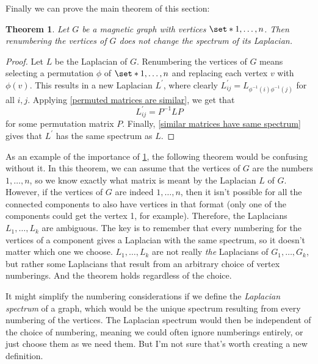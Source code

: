 \documentclass[12pt]{article}
\newtheorem{thm}{Theorem}
\theoremstyle{definition}
\begin{document}
Finally we can prove the main theorem of this section:

\begin{thm}\label{renumbering vertices doesn't change Laplacian spectrum}
Let $G$ be a magnetic graph with vertices $\set*{1, \dots, n}$. Then renumbering the vertices of $G$ does not change the spectrum of its Laplacian.
\end{thm}
\begin{proof}
Let $L$ be the Laplacian of $G$. Renumbering the vertices of $G$ means selecting a permutation $\phi$ of $\set*{1, \dots, n}$ and replacing each vertex $v$ with $\phi(v)$. This results in a new Laplacian $L^\prime$, where clearly $L^\prime_{ij} = L_{\phi^{-1}(i)\phi^{-1}(j)}$ for all $i, j$. Applying \cref{permuted matrices are similar}, we get that 
$$L^\prime_{ij}=P^{-1}LP$$
for some permutation matrix $P$. Finally, \cref{similar matrices have same spectrum} gives that $L^\prime$ has the same spectrum as $L$.  
\end{proof}

As an example of the importance of \cref{renumbering vertices doesn't change Laplacian spectrum}, the following theorem would be confusing without it. In this theorem, we can assume that the vertices of $G$ are the numbers $1, \dots, n$, so we know exactly what matrix is meant by the Laplacian $L$ of $G$. However, if the vertices of $G$ are indeed $1, \dots, n$, then it isn't possible for all the connected components to also have vertices in that format (only one of the components could get the vertex 1, for example). Therefore, the Laplacians $L_1, \dots, L_k$ are ambiguous. The key is to remember that every numbering for the vertices of a component gives a Laplacian with the same spectrum, so it doesn't matter which one we choose. $L_1, \dots, L_k$ are not really \textit{the} Laplacians of $G_1, \dots, G_k$, but rather some Laplacians that result from an arbitrary choice of vertex numberings. And the theorem holds regardless of the choice. 

It might simplify the numbering considerations if we define the \textit{Laplacian spectrum} of a graph, which would be the unique spectrum resulting from every numbering of the vertices. The Laplacian spectrum would then be independent of the choice of numbering, meaning we could often ignore numberings entirely, or just choose them as we need them. But I'm not sure that's worth creating a new definition.
\end{document}
